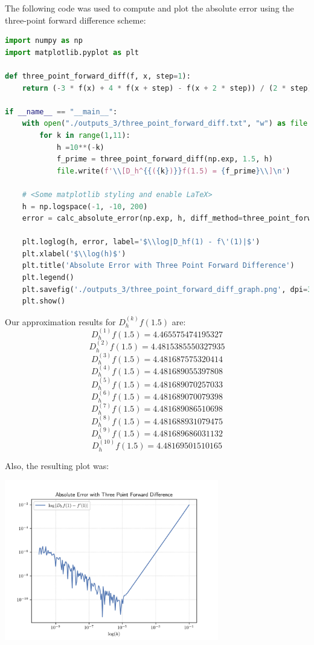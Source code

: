 \documentclass[12pt]{article}
\begin{document}
The following code was used to compute and plot the absolute error using the three-point forward difference scheme:
\begin{lstlisting}[language=Python, caption=2.4 Python]
import numpy as np 
import matplotlib.pyplot as plt

def three_point_forward_diff(f, x, step=1):
    return (-3 * f(x) + 4 * f(x + step) - f(x + 2 * step)) / (2 * step)

if __name__ == "__main__":
    with open("./outputs_3/three_point_forward_diff.txt", "w") as file:
        for k in range(1,11):
            h =10**(-k)
            f_prime = three_point_forward_diff(np.exp, 1.5, h)
            file.write(f'\\[D_h^{{({k})}}f(1.5) = {f_prime}\\]\n')

    # <Some matplotlib styling and enable LaTeX>
    h = np.logspace(-1, -10, 200)
    error = calc_absolute_error(np.exp, h, diff_method=three_point_forward_diff)
    
    plt.loglog(h, error, label='$\\log|D_hf(1) - f\'(1)|$')
    plt.xlabel('$\\log(h)$')
    plt.title('Absolute Error with Three Point Forward Difference')
    plt.legend()
    plt.savefig('./outputs_3/three_point_forward_diff_graph.png', dpi=300)
    plt.show()
\end{lstlisting}

\newpage
Our approximation results for $D_h^{(k)}f(1.5)$ are:
\[D_h^{(1)}f(1.5) = 4.465575474195327\]
\[D_h^{(2)}f(1.5) = 4.4815385550327935\]
\[D_h^{(3)}f(1.5) = 4.481687575320414\]
\[D_h^{(4)}f(1.5) = 4.481689055397808\]
\[D_h^{(5)}f(1.5) = 4.481689070257033\]
\[D_h^{(6)}f(1.5) = 4.481689070079398\]
\[D_h^{(7)}f(1.5) = 4.481689086510698\]
\[D_h^{(8)}f(1.5) = 4.481688931079475\]
\[D_h^{(9)}f(1.5) = 4.481689686031132\]
\[D_h^{(10)}f(1.5) = 4.48169501510165\]

Also, the resulting plot was:
\begin{center}
\includegraphics[width=0.7\textwidth]{../outputs_3/three_point_forward_diff_graph.png}
\end{center}
\end{document}
